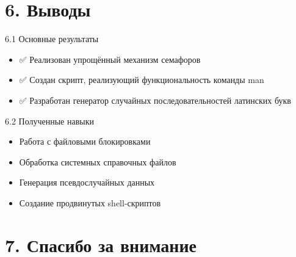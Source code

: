 \documentclass[
  ignorenonframetext,
  aspectratio=169,
  russian,
]{beamer}
\providecommand{\tightlist}{%
  \setlength{\itemsep}{0pt}\setlength{\parskip}{0pt}}
\begin{document}
\section{6. Выводы}\label{ux432ux44bux432ux43eux434ux44b}

\begin{frame}{6.1 Основные результаты}
\label{ux43eux441ux43dux43eux432ux43dux44bux435-ux440ux435ux437ux443ux43bux44cux442ux430ux442ux44b}
\begin{itemize}[<+->]
\tightlist
\item
  ✅ Реализован упрощённый механизм семафоров
\item
  ✅ Создан скрипт, реализующий функциональность команды man
\item
  ✅ Разработан генератор случайных последовательностей латинских букв
\end{itemize}
\end{frame}

\begin{frame}{6.2 Полученные навыки}
\label{ux43fux43eux43bux443ux447ux435ux43dux43dux44bux435-ux43dux430ux432ux44bux43aux438}
\begin{itemize}[<+->]
\tightlist
\item
  Работа с файловыми блокировками
\item
  Обработка системных справочных файлов
\item
  Генерация псевдослучайных данных
\item
  Создание продвинутых shell-скриптов
\end{itemize}
\end{frame}

\section{7. Спасибо за
внимание}\label{ux441ux43fux430ux441ux438ux431ux43e-ux437ux430-ux432ux43dux438ux43cux430ux43dux438ux435}
\end{document}
